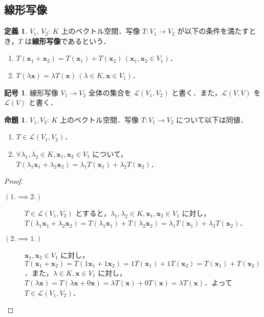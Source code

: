 \documentclass{jlreq}
\theoremstyle{definition}
\newtheorem{dfn}[thm]{定義}
\newtheorem{sym}[thm]{記号}
\newtheorem{prop}[thm]{命題}
\begin{document}
    \subsection{線形写像}
      \begin{dfn}
        $V_1$, $V_2$: $K$ 上のベクトル空間．写像 $T \colon V_1 \to V_2$ が以下の条件を満たすとき，$T$ は\textbf{線形写像}であるという．
        \begin{enumerate}
          \item $T(\bm{x}_1+\bm{x}_2)=T(\bm{x}_1)+T(\bm{x}_2) \, (\bm{x}_1,\bm{x}_2 \in V_1)$．
          \item $T(\lambda\bm{x})=\lambda T(\bm{x}) \, (\lambda \in K, \bm{x} \in V_1)$．
        \end{enumerate}
      \end{dfn}
      \begin{sym}
        線形写像 $V_1 \to V_2$ 全体の集合を $\mathcal{L}(V_1,V_2)$ と書く．また，$\mathcal{L}(V,V)$ を $\mathcal{L}(V)$ と書く．
      \end{sym}
      \begin{prop}
        $V_1, V_2$: $K$ 上のベクトル空間．写像 $T \colon V_1 \to V_2$ について以下は同値．
        \begin{enumerate}
          \item $T \in \mathcal{L}(V_1,V_2)$．
          \item $\forall \lambda_1,\lambda_2 \in K, \bm{x}_1,\bm{x}_2 \in V_1$ について，$T(\lambda_1\bm{x}_1+\lambda_2\bm{x}_2)=\lambda_1T(\bm{x}_1)+\lambda_2T(\bm{x}_2)$．
        \end{enumerate}
      \end{prop}
      \begin{proof}
        \mbox{}
        \begin{description}
          \item [$(1. \implies 2.) \, $]
            \mbox{}
            
            $T \in \mathcal{L}(V_1,V_2)$ とすると，$\lambda_1,\lambda_2 \in K, \bm{x}_1,\bm{x}_2 \in V_1$ に対し，$T(\lambda_1\bm{x}_1+\lambda_2\bm{x}_2)=T(\lambda_1\bm{x}_1)+T(\lambda_2\bm{x}_2)=\lambda_1T(\bm{x}_1)+\lambda_2T(\bm{x}_2)$．
          \item [$(2. \implies 1.) \, $]
            \mbox{}
            
            $\bm{x}_1,\bm{x}_2 \in V_1$ に対し，$T(\bm{x}_1+\bm{x}_2)=T(1\bm{x}_1+1\bm{x}_2)=1T(\bm{x}_1)+1T(\bm{x}_2)=T(\bm{x}_1)+T(\bm{x}_2)$．また，$\lambda \in K, \bm{x} \in V_1$ に対し，$T(\lambda \bm{x}) = T(\lambda \bm{x} + 0\bm{x}) = \lambda T(\bm{x}) + 0T(\bm{x}) = \lambda T(\bm{x})$．よって $T\in\mathcal{L}(V_1,V_2)$．
        \end{description}
      \end{proof}
\end{document}
